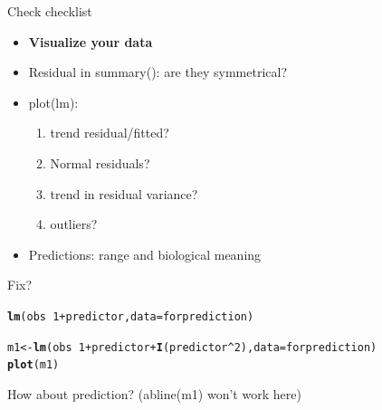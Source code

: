 \documentclass[10pt]{beamer}\usepackage[]{graphicx}\usepackage[]{color}
\makeatletter
\newcommand{\hlnum}[1]{\textcolor[rgb]{0.686,0.059,0.569}{#1}}%
\newcommand{\hlopt}[1]{\textcolor[rgb]{0,0,0}{#1}}%
\newcommand{\hlstd}[1]{\textcolor[rgb]{0.345,0.345,0.345}{#1}}%
\newcommand{\hlkwb}[1]{\textcolor[rgb]{0.69,0.353,0.396}{#1}}%
\newcommand{\hlkwc}[1]{\textcolor[rgb]{0.333,0.667,0.333}{#1}}%
\newcommand{\hlkwd}[1]{\textcolor[rgb]{0.737,0.353,0.396}{\textbf{#1}}}%
\newenvironment{kframe}{%
 \def\at@end@of@kframe{}%
 \ifinner\ifhmode%
  \def\at@end@of@kframe{\end{minipage}}%
  \begin{minipage}{\columnwidth}%
 \fi\fi%
 \def\FrameCommand##1{\hskip\@totalleftmargin \hskip-\fboxsep
 \colorbox{shadecolor}{##1}\hskip-\fboxsep
     \hskip-\linewidth \hskip-\@totalleftmargin \hskip\columnwidth}%
 \MakeFramed {\advance\hsize-\width
   \@totalleftmargin\z@ \linewidth\hsize
   \@setminipage}}%
 {\par\unskip\endMakeFramed%
 \at@end@of@kframe}
\newenvironment{knitrout}{}{} %
\makeatother
\begin{document}
\begin{frame}{Check checklist}
  \begin{exampleblock}{}
    \begin{itemize}
      \item \textbf{Visualize your data}
      \item Residual in summary(): are they symmetrical?
      \item plot(lm):
        \begin{enumerate}
          \item trend residual/fitted?
          \item Normal residuals?
          \item trend in residual variance?
          \item outliers?
        \end{enumerate}
      \item Predictions: range and biological meaning
    \end{itemize}
  \end{exampleblock}
  
  
\end{frame}

\begin{frame}[fragile]{Fix?}
\begin{knitrout}
\color{fgcolor}\begin{kframe}
\begin{alltt}
\hlkwd{lm}\hlstd{(obs} \hlopt{~} \hlnum{1} \hlopt{+} \hlstd{predictor ,} \hlkwc{data}\hlstd{=forprediction)}
\end{alltt}
\end{kframe}
\end{knitrout}
  \pause

\begin{knitrout}
\color{fgcolor}\begin{kframe}
\begin{alltt}
\hlstd{m1} \hlkwb{<-} \hlkwd{lm}\hlstd{(obs} \hlopt{~} \hlnum{1} \hlopt{+} \hlstd{predictor} \hlopt{+} \hlkwd{I}\hlstd{(predictor}\hlopt{^}\hlnum{2}\hlstd{),} \hlkwc{data}\hlstd{=forprediction)}
\hlkwd{plot}\hlstd{(m1)}
\end{alltt}
\end{kframe}
\end{knitrout}

  How about prediction? (abline(m1) won't work here)
\end{frame}
\end{document}
